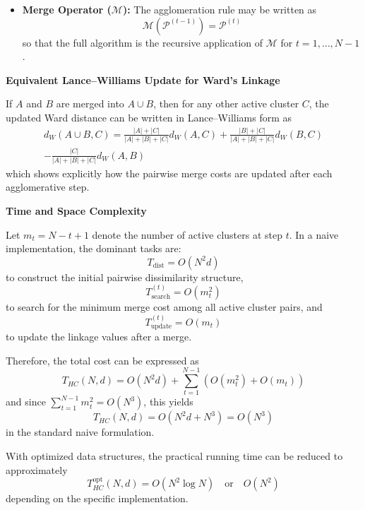 \begin{itemize}
  \item \textbf{Merge Operator ($\mathcal{M}$):} The agglomeration rule may be written as
  \begin{equation}
    \mathcal{M}(\mathcal{P}^{(t-1)}) = \mathcal{P}^{(t)}
  \end{equation}
  so that the full algorithm is the recursive application of $\mathcal{M}$ for $t=1,\dots,N-1$.
\end{itemize}

\textbf{Equivalent Lance--Williams Update for Ward's Linkage}

If $A$ and $B$ are merged into $A \cup B$, then for any other active cluster $C$, the updated Ward distance can be written in Lance--Williams form as
\begin{multline}
  d_{W}(A \cup B, C)
  =
  \frac{|A| + |C|}{|A| + |B| + |C|}d_W(A,C)
  +
  \frac{|B| + |C|}{|A| + |B| + |C|}d_W(B,C) \\
  -
  \frac{|C|}{|A| + |B| + |C|}d_W(A,B)
\end{multline}
which shows explicitly how the pairwise merge costs are updated after each agglomerative step.

\textbf{Time and Space Complexity}

Let $m_t = N - t + 1$ denote the number of active clusters at step $t$. In a naive implementation, the dominant tasks are:
\begin{equation}
  T_{\text{dist}} = O(N^2 d)
\end{equation}
to construct the initial pairwise dissimilarity structure,
\begin{equation}
  T_{\text{search}}^{(t)} = O(m_t^2)
\end{equation}
to search for the minimum merge cost among all active cluster pairs, and
\begin{equation}
  T_{\text{update}}^{(t)} = O(m_t)
\end{equation}
to update the linkage values after a merge.

Therefore, the total cost can be expressed as
\begin{equation}
  T_{HC}(N,d)
  =
  O(N^2 d)
  +
  \sum_{t=1}^{N-1}\left(O(m_t^2) + O(m_t)\right)
\end{equation}
and since $\sum_{t=1}^{N-1} m_t^2 = O(N^3)$, this yields
\begin{equation}
  T_{HC}(N,d) = O(N^2 d + N^3) = O(N^3)
\end{equation}
in the standard naive formulation.

With optimized data structures, the practical running time can be reduced to approximately
\begin{equation}
  T_{HC}^{\text{opt}}(N,d) = O(N^2 \log N) \quad \text{or} \quad O(N^2)
\end{equation}
depending on the specific implementation.

